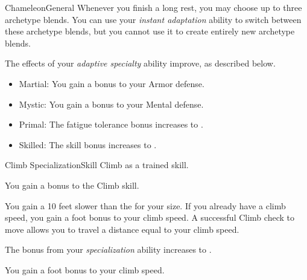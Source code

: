 \begin{feat}{Chameleon}{General}
    Whenever you finish a long rest, you may choose up to three archetype blends.
    You can use your \textit{instant adaptation} ability to switch between these archetype blends, but you cannot use it to create entirely new archetype blends.

     The effects of your \textit{adaptive specialty} ability improve, as described below.
    \begin{itemize}
      \item Martial: You gain a  bonus to your Armor defense.
      \item Mystic: You gain a  bonus to your Mental defense.
      \item Primal: The fatigue tolerance bonus increases to .
      \item Skilled: The skill bonus increases to .
    \end{itemize}
  \end{feat}

  \begin{feat}{Climb Specialization}{Skill}
    \featpre Climb as a trained skill.

     You gain a  bonus to the Climb skill.

     You gain a  10 feet slower than the  for your size.
    If you already have a climb speed, you gain a  foot bonus to your climb speed.
    A successful Climb check to move allows you to travel a distance equal to your climb speed.

     The bonus from your \textit{specialization} ability increases to .

     You gain a  foot bonus to your climb speed.
  \end{feat}

